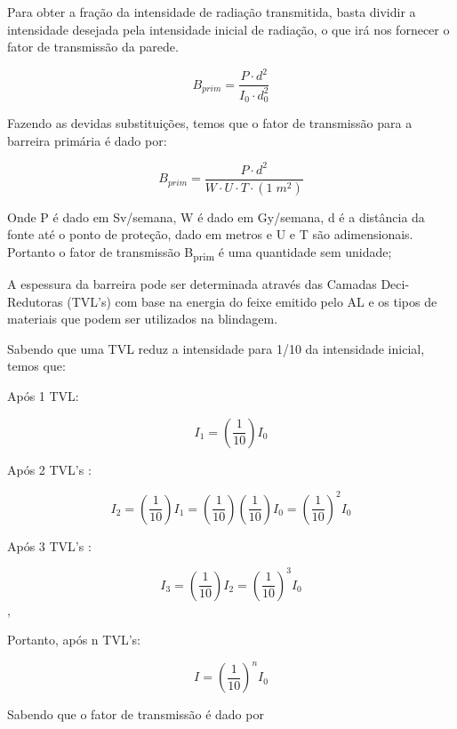 \documentclass[11pt,a4paper]{article}
\begin{document}
            Para obter a fração da intensidade de radiação transmitida, basta dividir a intensidade desejada pela intensidade inicial de radiação, o que irá nos fornecer o fator de transmissão da parede.

            
                $$B_{prim} = \frac{P \cdot d^2}{I_0 \cdot d_0^2}$$
            
            Fazendo as devidas substituições, temos que o fator de transmissão para a barreira primária é dado por:

            \begin{equation}
                B_{prim} = \frac{P \cdot d^2}{W \cdot U \cdot T \cdot (1 \; m^2)}
                \label{eq:fatorDeTransmissao}
            \end{equation}

            Onde P é dado em Sv/semana, W é dado em Gy/semana, d é a distância da fonte até o ponto de proteção,  dado em metros e U e T são adimensionais. Portanto o fator de transmissão B\textsubscript{prim} é uma quantidade sem unidade; 

            A espessura da barreira pode ser determinada através das Camadas Deci-Redutoras (TVL's) com base na energia do feixe emitido pelo AL e os tipos de materiais que podem ser utilizados na blindagem. 

            Sabendo que uma TVL reduz a intensidade para 1/10 da intensidade inicial, temos que:
            
            Após 1 TVL:

            $$I_1 = \left(\frac{1}{10}\right)I_0$$

            Após 2 TVL's :

            $$I_2 = \left(\frac{1}{10}\right)I_1 = \left(\frac{1}{10}\right)\left(\frac{1}{10}\right)I_0 = \left(\frac{1}{10}\right)^2 I_0$$

            Após 3 TVL's :

            $$I_3 = \left(\frac{1}{10}\right)I_2 = \left(\frac{1}{10}\right)^3 I_0$$,  

            Portanto, após n TVL's:

            \begin{equation}
                I = \left(\frac{1}{10}\right)^n I_0
                \label{eq:intensidadeAposnTVL}
            \end{equation}
            


            Sabendo que o fator de transmissão é dado por 
            
\end{document}
